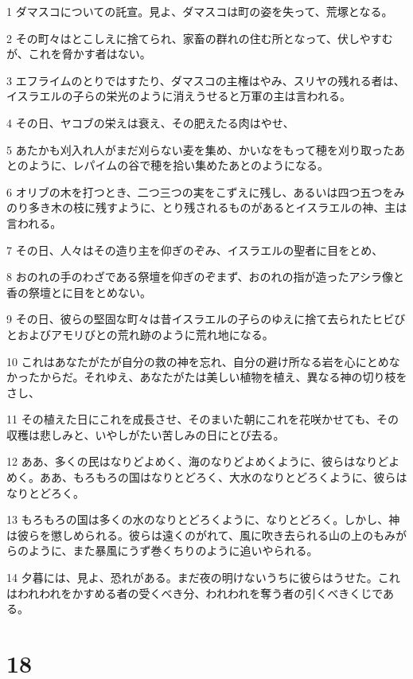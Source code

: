 \par 1 ダマスコについての託宣。見よ、ダマスコは町の姿を失って、荒塚となる。
\par 2 その町々はとこしえに捨てられ、家畜の群れの住む所となって、伏しやすむが、これを脅かす者はない。
\par 3 エフライムのとりではすたり、ダマスコの主権はやみ、スリヤの残れる者は、イスラエルの子らの栄光のように消えうせると万軍の主は言われる。
\par 4 その日、ヤコブの栄えは衰え、その肥えたる肉はやせ、
\par 5 あたかも刈入れ人がまだ刈らない麦を集め、かいなをもって穂を刈り取ったあとのように、レパイムの谷で穂を拾い集めたあとのようになる。
\par 6 オリブの木を打つとき、二つ三つの実をこずえに残し、あるいは四つ五つをみのり多き木の枝に残すように、とり残されるものがあるとイスラエルの神、主は言われる。
\par 7 その日、人々はその造り主を仰ぎのぞみ、イスラエルの聖者に目をとめ、
\par 8 おのれの手のわざである祭壇を仰ぎのぞまず、おのれの指が造ったアシラ像と香の祭壇とに目をとめない。
\par 9 その日、彼らの堅固な町々は昔イスラエルの子らのゆえに捨て去られたヒビびとおよびアモリびとの荒れ跡のように荒れ地になる。
\par 10 これはあなたがたが自分の救の神を忘れ、自分の避け所なる岩を心にとめなかったからだ。それゆえ、あなたがたは美しい植物を植え、異なる神の切り枝をさし、
\par 11 その植えた日にこれを成長させ、そのまいた朝にこれを花咲かせても、その収穫は悲しみと、いやしがたい苦しみの日にとび去る。
\par 12 ああ、多くの民はなりどよめく、海のなりどよめくように、彼らはなりどよめく。ああ、もろもろの国はなりとどろく、大水のなりとどろくように、彼らはなりとどろく。
\par 13 もろもろの国は多くの水のなりとどろくように、なりとどろく。しかし、神は彼らを懲しめられる。彼らは遠くのがれて、風に吹き去られる山の上のもみがらのように、また暴風にうず巻くちりのように追いやられる。
\par 14 夕暮には、見よ、恐れがある。まだ夜の明けないうちに彼らはうせた。これはわれわれをかすめる者の受くべき分、われわれを奪う者の引くべきくじである。

\chapter{18}


